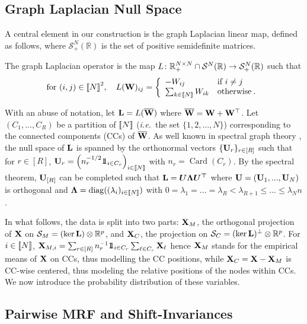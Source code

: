 \subsection{Graph Laplacian Null Space}\label{sec:laplacian_prop}
A central element in our construction is the graph Laplacian linear map, defined as follows, where $\mathcal{S}^N_+(\mathbb{R})$ is the set of positive semidefinite matrices.
\begin{definition}\label{graph_laplacian}
The graph Laplacian operator is the map $L \colon \mathbb{R}_+^{N \times N} \cap \mathcal{S}^N(\mathbb{R}) \to \mathcal{S}^N_+(\mathbb{R})$ such that
$$\text{for } (i,j) \in {[\![N]\!]}^2, \quad L({\mathbf{W}})_{ij} = \left\{
\begin{array}{ll}
    - W_{ij} & \text{if } i \neq j \\
    \sum_{k \in {[\![N]\!]}} W_{ik} & \text{otherwise} \:.
\end{array} 
\right. $$
\end{definition}
With an abuse of notation, let $\mathbf{L} = L(\overline{{\mathbf{W}}})$ where $\overline{{\mathbf{W}}} = {\mathbf{W}} + {\mathbf{W}}^\top$. Let $(C_1,...,C_{R})$ be a partition of ${[\![N]\!]}$ (\textit{i.e.}\ the set $\{1,2,...,N\}$) corresponding to the connected components (CCs) of $\overline{{\mathbf{W}}}$. As well known in spectral graph theory \citep{Chung97}, the null space of $\mathbf{L}$ is spanned by the orthonormal vectors $\{\mathbf{U}_{r}\}_{r \in [R]}$ such that for $r \in [R]$,
$\mathbf{U}_{r} = \left(n_r^{-1/2} 1\!\!1_{i \in C_r}\right)_{i \in {[\![N]\!]}}$ with $n_r = \operatorname{Card}(C_r)$. By the spectral theorem, $\mathbf{U}_{[R]}$ can be completed such that $\mathbf{L} = \bm{U \Lambda U^\top}$ where $\mathbf{U} = (\mathbf{U}_1, ..., \mathbf{U}_N)$ is orthogonal and $\bm{\Lambda} = \operatorname{diag}((\lambda_i)_{i \in {[\![N]\!]}})$ with $0 = \lambda_1 = ... = \lambda_R < \lambda_{R+1} \leq ... \leq \lambda_Nn$. 

In what follows, the data is split into two parts: $\mathbf{X}_{M}$, the orthogonal projection of $\mathbf{X}$ on $\mathcal{S}_{M} = (\ker \mathbf{L}) \otimes \mathbb{R}^p$, and $\mathbf{X}_{C}$, the projection on $\mathcal{S}_{C} = (\ker \mathbf{L})^{\perp} \otimes \mathbb{R}^p$. For $i \in {[\![N]\!]}$, $\mathbf{X}_{M,i} = \sum_{r \in [R]} n_r^{-1} 1\!\!1_{i \in C_r}\sum_{\ell \in C_r} \mathbf{X}_{\ell} $ hence $\mathbf{X}_{M}$ stands for the empirical means of $\mathbf{X}$ on CCs, thus modelling the CC positions, while $\mathbf{X}_{C} = \mathbf{X} - \mathbf{X}_{M}$ is CC-wise centered, thus modeling the relative positions of the nodes within CCs. We now introduce the probability distribution of these variables.

\subsection{Pairwise MRF and Shift-Invariances}\label{sec:within_CC}


